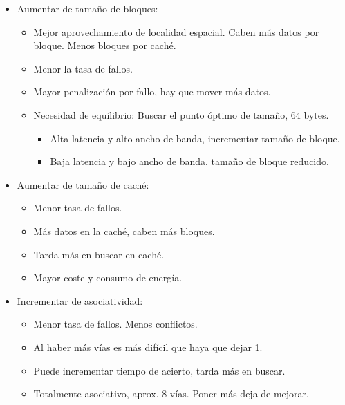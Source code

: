 \documentclass[12pt, twoside, openright]{report} %
\begin{document}
  \begin{itemize}
  
  \item
    Aumentar de tamaño de bloques:

    \begin{itemize}
    
    \item
      Mejor aprovechamiento de localidad espacial. Caben más datos por
      bloque. Menos bloques por caché.
    \item
      Menor la tasa de fallos.
    \item
      Mayor penalización por fallo, hay que mover más datos.
    \item
      Necesidad de equilibrio: Buscar el punto óptimo de tamaño, 64
      bytes.

      \begin{itemize}
      
      \item
        Alta latencia y alto ancho de banda, incrementar tamaño de
        bloque.
      \item
        Baja latencia y bajo ancho de banda, tamaño de bloque reducido.
      \end{itemize}
    \end{itemize}
  \item
    Aumentar de tamaño de caché:

    \begin{itemize}
    
    \item
      Menor tasa de fallos.
    \item
      Más datos en la caché, caben más bloques.
    \item
      Tarda más en buscar en caché.
    \item
      Mayor coste y consumo de energía.
    \end{itemize}
  \item
    Incrementar de asociatividad:

    \begin{itemize}
    
    \item
      Menor tasa de fallos. Menos conflictos.
    \item
      Al haber más vías es más difícil que haya que dejar 1.
    \item
      Puede incrementar tiempo de acierto, tarda más en buscar.
    \item
      Totalmente asociativo, aprox. 8 vías. Poner más deja de mejorar.
    \end{itemize}
  \end{itemize}
\end{document}
